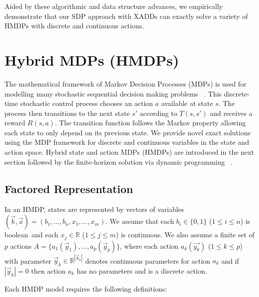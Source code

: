 \documentclass[twoside,11pt]{article}
\begin{document}
Aided by these algorithmic and data structure advances, we empirically demonstrate that our SDP approach with XADDs can exactly solve a variety of HMDPs with discrete and continuous actions. 


\section{Hybrid MDPs (HMDPs)}
The mathematical framework of Markov Decision Processes (MDPs) is used for modelling many stochastic sequential decision making problems ~\cite{bellman}. This discrete-time stochastic control process chooses an action $a$ available at state $s$. The process then transitions to the next state $s'$ according to $T(s,s')$ and receives a reward $R(s,a)$. The transition function follows the Markov property allowing each state to only depend on its previous state.  We provide novel exact solutions using the MDP framework for discrete and continuous variables in the state and action space. Hybrid state and action MDPs (HMDPs) are introduced in the next section followed by the finite-horizon solution via dynamic programming ~\cite{li05}.
\subsection{Factored Representation}
\label{sec:HMDPs}
In an HMDP, states are represented by vectors of variables
$(\vec{b},\vec{x}) = ( b_1,\ldots,b_n,x_{1},\ldots,x_m )$.  We assume
that each $b_i \in \{ 0,1 \}$ ($1 \leq i \leq n$) is boolean$\,$
and each $x_j \in \mathbb{R}$ ($1 \leq j \leq
m$) is continuous.  We also assume a finite set of $p$ actions 
$A = \{a_{1}(\vec{y}_1), \ldots, a_{p}(\vec{y}_p)\}$, where each action $a_k(\vec{y_k})$ ($1
\leq k \leq p$)  with parameter $\vec{y}_k \in \mathbb{R}^{|\vec{y}_k|}$  denotes continuous parameters for 
action $a_{k}$ and  if $|\vec{y}_k|=0$ then action $a_{k}$ has no parameters and is a discrete action.

Each HMDP model requires the following definitions: 
\end{document}
